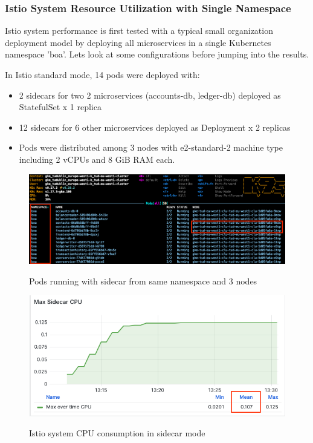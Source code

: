 \subsubsection{Istio System Resource Utilization with Single Namespace}
Istio system performance is first tested with a typical small organization deployment model by deploying all microservices in a single Kubernetes namespace 'boa'. Lets look at some configurations before jumping into the results.

In Istio standard mode, 14 pods were deployed  with:
\begin{itemize}
    \item 2 sidecars for two 2 microservices (accounts-db, ledger-db) deployed as StatefulSet x 1 replica
    \item 12 sidecars for 6 other microservices deployed as Deployment x 2 replicas
    \item Pods were distributed among 3 nodes with e2-standard-2 machine type including 2 vCPUs and 8 GiB RAM each.
\end{itemize}


\begin{figure}[ht!]
    \centering
    \caption{Pods running with sidecar from same namespace and 3 nodes}
    \includegraphics[width=0.9\linewidth]{resources/single-ns-deployed.png}
    \label{result:singleNSDeployed}
\end{figure}
\pagebreak

\begin{figure}[ht!]
    \centering
    \caption{Istio system CPU consumption in sidecar mode}
    \includegraphics[width=0.9\linewidth]{resources/max-sidecar-cpu.png}
    \label{result:maxSidecarCpu}
\end{figure}

